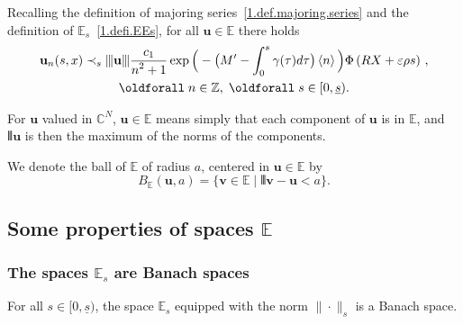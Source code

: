 \documentclass[AHL,Unicode,longabstracts,published]{cedram}
\theoremstyle{plain}
\newcommand*\e{\varepsilon}
\newcommand*\Z{{\mathbb Z}}
\newcommand*\EE{{\mathbb E}}
\newcommand*\g{\gamma}
\newcommand{\ubf}{{\mathbf u}}
\newcommand{\vbf}{{\mathbf v}}
\newcommand*\und{\underline}
\DeclarePairedDelimiter{\VERT}{|\mkern -1.6mu|\mkern -1.6mu|}{|\mkern -1.6mu|\mkern -1.6mu|}
\renewcommand*{\forall}{\mathrel{\oldforall}}
\begin{document}
Recalling the definition of majoring series~\eqref{1.def.majoring.series} and the definition of $\EE_{s}$~\eqref{1.defi.EEs}, for all $\ubf\in\EE$ there holds
\begin{multline}\label{1.esti.u}
\ubf_n(s,x) \prec_{s} \VERT{\ubf} \frac{\displaystyle c_1}{\displaystyle n^2+1}\exp\Big({}-\big(M' - \int_{0}^{s} \g(\tau) d\tau \big)\left< n \right>\Big) \Phi\left(R X+\e\rho s\right)\,,\\
\forall n \in\Z,\; \forall s\in[0,\und{s}).
\end{multline}


For $\ubf$ valued in $\mathbb{C}^{N}$, $\ubf\in\EE$ means simply that each component of $\ubf$ is in $\EE$, and $\VERT{ \ubf}$ is then the maximum of the norms of the components.

We denote the ball of $\EE$ of radius $a$, centered in $\ubf\in\EE$ by
\begin{equation}\label{1.defi.ball}
B_{\EE}(\ubf,a) = \big\{ \vbf\in\EE \;|\; \VERT{\vbf - \ubf} < a \big\}.
\end{equation}



\subsection{Some properties of spaces \texorpdfstring{$\EE$}{EE}}


\subsubsection{The spaces \texorpdfstring{$\EE_{s}$}{EEs} are Banach spaces}


\begin{prop}
For all $s\in[0,\und{s})$, the space $\EE_{s}$ equipped with the norm $\|\cdot\|_{s}$ is a Banach space.
\end{prop}
\end{document}
